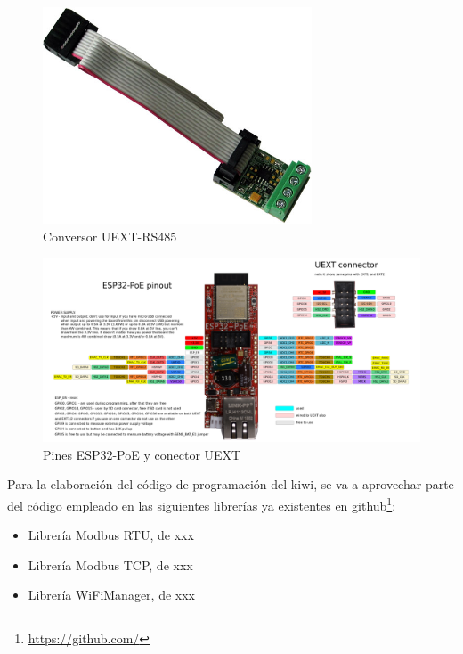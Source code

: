 \begin{figure}[h]
  \centering
  \includegraphics[width=8cm, keepaspectratio]{img/UEXT-RS485}
  \caption{Conversor UEXT-RS485}
  \label{figura:imgconversoruext}
\end{figure}

\hspace{1em}

\begin{figure}[h!]
  \centering
  \includegraphics[width=\textwidth, keepaspectratio]{img/ESP32-POE-GPIO}
  \caption{Pines ESP32-PoE y conector UEXT}
  \label{figura:pinesesp32}
\end{figure}

Para la elaboración del código de programación del kiwi, se va a aprovechar parte del código empleado en las siguientes librerías ya existentes en github\footnote{\url{https://github.com/}}:

\begin{itemize}
  \item Librería Modbus RTU, de xxx  
  \item Librería Modbus TCP, de xxx
  \item Librería WiFiManager, de xxx
\end{itemize}

\hspace{2em}

